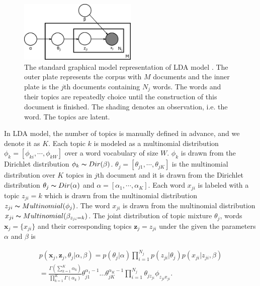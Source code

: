 \begin{figure}[!htp]
	\centering
	\includegraphics[width = 0.5\textwidth]{figures/Latent_Dirichlet_allocation.pdf}
	\caption[The standard graphical model representation of LDA model]
	{The standard graphical model representation of LDA model \cite{blei2003latent}. The outer plate represents the corpus with $M$ documents and the inner plate is the $j$th documents containing $N_j$ words. The words and their topics are repeatedly choice until the construction of this document is finished. The shading denotes an observation, i.e. the word. The topics are latent.}
	\label{fig:lda}
\end{figure}

In LDA model, the number of topics is manually defined in advance, and we denote it as $K$. Each topic $k$ is modeled as a multinomial distribution $\phi_k=[\phi_{ki},\cdots,\phi_{kW}]$ over a word vocabulary of size $W$. $\phi_k$ is drawn from the Dirichlet distribution $\phi_k \thicksim Dir(\beta)$. 
$\theta_j = [\theta_{j1},\cdots,\theta_{jK}]$ is the multinomial distribution over $K$ topics in $j$th document and it is drawn from the Dirichlet distribution $\theta_j \thicksim Dir(\alpha)$ and $\alpha = [\alpha_1,\cdots,\alpha_K]$.  Each word $x_{ji}$ is labeled with a topic $z_{ji}=k$ which is drawn from the multinomial distribution $z_{ji} \thicksim Multinomial(\phi_j)$. The word $x_{ji}$ is drawn from the multinomial distribution $x_{ji} \thicksim Multinomial(\beta_{z_{ji}=k})$. The joint distribution of topic mixture $\theta_j$, words $\mathbf{x}_j = \{x_{ji} \}$ and their corresponding topics $\mathbf{z}_j={z_{ji}}$ under the given the parameters $\alpha$ and $\beta$ is

\begin{equation}
	\begin{aligned}
		p(\mathbf{x}_j, \mathbf{z}_j, \theta_j|\alpha, \beta) = p(\theta_j|\alpha)\prod_{i=1}^{N_j}p(z_{ji}|\theta_j)p(x_{ji}|z_{ji}, \beta)\\
		=\frac{\Gamma(\sum_{k=1}^K \alpha_k)}{\prod_{k=1}^K \Gamma(\alpha_k)} \theta_{j1}^{\alpha_1-1}...\theta_{jK}^{\alpha_K-1}\prod_{i=1}^{N_j}\theta_{jz_{ji}}\phi_{z_{ji}x_{ji}}.
	\end{aligned}
	\label{eq:lda_joint_distri}
\end{equation}


